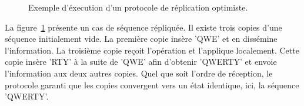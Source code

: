 \begin{figure}
  \centering
  
  \caption{\label{repl:fig:optimisticexample} Exemple d'éxecution d'un protocole
    de réplication optimiste.}
\end{figure}

La figure~\ref{repl:fig:optimisticexample} présente un cas de séquence
répliquée.  Il existe trois copies d'une séquence initialement vide. La première
copie insère 'QWE' et en dissémine l'information. La troisième copie reçoit
l'opération et l'applique localement. Cette copie insère 'RTY' à la suite de
'QWE' afin d'obtenir 'QWERTY' et envoie l'information aux deux autres
copies. Quel que soit l'ordre de réception, le protocole garanti que les copies
convergent vers un état identique, ici, la séquence 'QWERTY'.

